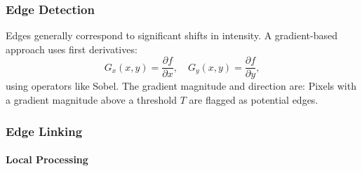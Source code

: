 \documentclass[a4paper,12pt]{article}
\begin{document}
\subsubsection{Edge Detection}

Edges generally correspond to significant shifts in intensity. A gradient-based approach uses first derivatives:
\[
G_x(x,y) = \frac{\partial f}{\partial x}, \quad
G_y(x,y) = \frac{\partial f}{\partial y},
\]
using operators like Sobel. The gradient magnitude and direction are:
Pixels with a gradient magnitude above a threshold \(T\) are flagged as potential edges.



\subsubsection{Edge Linking}


\paragraph{Local Processing}

\end{document}
